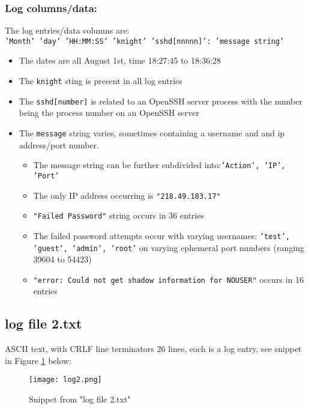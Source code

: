 \documentclass[
	letterpaper, %
	10pt, %
	unnumberedsections, %
	twoside, %
]{APAAssignment}
\begin{document}
\subsubsection{Log columns/data:} The log entries/data columns are: \\
\texttt{'Month' 'day' 'HH:MM:SS' 'knight' 'sshd[nnnnn]': 'message string'}
\begin{itemize}
  \item The dates are all August 1st, time 18:27:45 to 18:36:28
  \item The \texttt{knight} sting is present in all log entries
  \item The \texttt{sshd{[}number{]}} is related to an OpenSSH server process with the number being the process number on an OpenSSH server 
  \item The \texttt{message} string varies, sometimes containing a username and and ip address/port number.
  \begin{itemize}
	\item The message string can be further subdivided into:\texttt{'Action', 'IP', 'Port'}
	\item The only IP address occurring is \texttt{"218.49.183.17"}
	\item \texttt{"Failed Password"} string occurs in 36 entries
	\item The failed password attempts occur with varying usernames: \texttt{'test', 'guest', 'admin', 'root'} on varying ephemeral port numbers (ranging 39604 to 54423)
	\item \texttt{"error: Could not get shadow information for NOUSER"} occurs in 16 entries
  \end{itemize}
\end{itemize}

\subsection{log file 2.txt}\label{log-file-2.txt}
ASCII text, with CRLF line terminators 26 lines, each is a log entry, see snippet in Figure \ref{fig:log2} below: \\
\begin{figure}[!htp] %
	\centering
	\texttt{[image: log2.png]}
	\caption{Snippet from "log file 2.txt"}	\label{fig:log2}
\end{figure}
\end{document}
